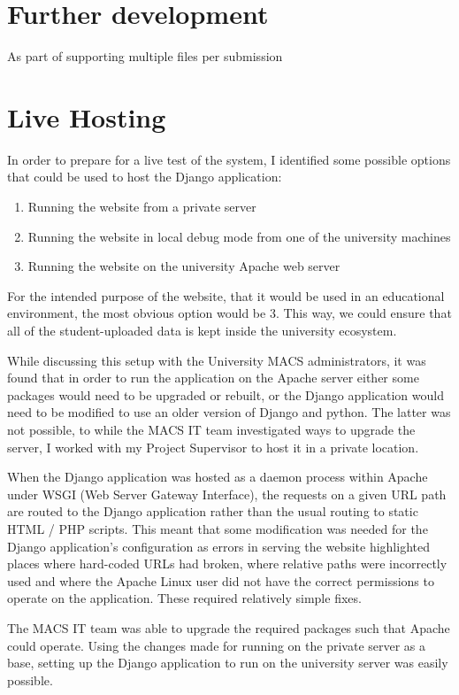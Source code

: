 \documentclass[a4paper,11pt]{report}
\begin{document}
\section{Further development}
As part of supporting multiple files per submission
\section{Live Hosting}
In order to prepare for a live test of the system, I identified some possible options that could be used to host the Django application:
\begin{enumerate}
\item Running the website from a private server
\item Running the website in local debug mode from one of the university machines
\item Running the website on the university Apache web server
\end{enumerate}
For the intended purpose of the website, that it would be used in an educational environment, the most obvious option would be 3. This way, we could ensure that all of the student-uploaded data is kept inside the university ecosystem.\par
While discussing this setup with the University MACS administrators, it was found that in order to run the application on the Apache server either some packages would need to be upgraded or rebuilt, or the Django application would need to be modified to use an older version of Django and python. The latter was not possible, to while the MACS IT team investigated ways to upgrade the server, I worked with my Project Supervisor to host it in a private location.\par
When the Django application was hosted as a daemon process within Apache under WSGI (Web Server Gateway Interface), the requests on a given URL path are routed to the Django application rather than the usual routing to static HTML / PHP scripts. This meant that some modification was needed for the Django application's configuration as errors in serving the website highlighted places where  hard-coded URLs had broken, where relative paths were incorrectly used and where the Apache Linux user did not have the correct permissions to operate on the application. These required relatively simple fixes.\par
The MACS IT team was able to upgrade the required packages such that Apache could operate. Using the changes made for running on the private server as a base, setting up the Django application to run on the university server was easily possible.
\end{document}
